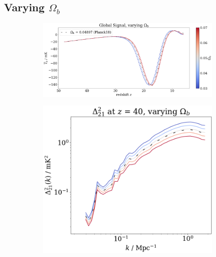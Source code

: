 \documentclass[floats,floatfix,showpacs,amssymb,prd,superscriptaddress,nofootinbib, 11pt]{revtex4-2} %
\begin{document}
\subsection{Varying $\Omega_b$}

\begin{figure}[H]
     \centering
     \begin{subfigure}[b]{0.8\textwidth}
         \centering
         \includegraphics[width=\textwidth]{images/simulation_results/global_signal_Ob.png}
         \label{fig:global_signal_Ob}
     \end{subfigure}
     \hfill
     \begin{subfigure}[b]{0.45\textwidth}
         \centering
         \includegraphics[width=\textwidth]{images/simulation_results/power_spectrum_fixed_z_40_Ob.png}
         \label{fig:power_spectrum_fixed_z_40_Ob}
     \end{subfigure}
     \hfill
     \begin{subfigure}[b]{0.45\textwidth}

\end{subfigure}
\end{figure}
\end{document}
